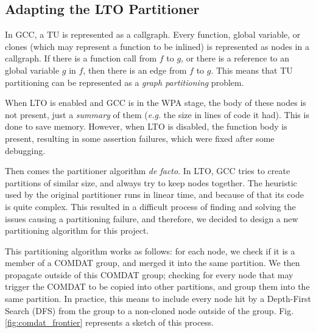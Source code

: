 \documentclass[runningheads]{llncs}
\begin{document}
\subsection{Adapting the LTO Partitioner}\label{sec:lto_partitioner}

In GCC, a TU is represented as a callgraph. Every function, global variable, or
clones (which may represent a function to be inlined) is represented as nodes
in a callgraph. If there is a function call from $f$ to $g$, or there is a
reference to an global variable $g$ in $f$, then there is an edge from $f$ to
$g$. This means that TU partitioning can be represented as a \emph{graph
partitioning} problem. 

When LTO is enabled and GCC is in the WPA stage, the body of these nodes
is not present, just a \textit{summary} of them (\textit{e.g.} the size
in lines of code it had). This is done to save memory. However,
when LTO is disabled, the function body is present, resulting
in some assertion failures, which were fixed after some debugging.

Then comes the partitioner algorithm \textit{de facto}. In LTO, GCC tries to
create partitions of similar size, and always try to keep nodes together. The
heuristic used by the original partitioner runs in linear time, and because of
that its code is quite complex. This resulted in a difficult process of finding
and solving the issues causing a partitioning failure, and therefore, we
decided to design a new partitioning algorithm for this project.

This partitioning algorithm works as follows: for each node, we check if it
is a member of a COMDAT \cite{comdat} group, and
merged it into the same partition. We then propagate outside of this COMDAT group;
checking for every node that may trigger the COMDAT to be copied into other
partitions, and group them into the same partition. In practice,
this means to include every node hit by a Depth-First
Search (DFS) from the group to a non-cloned node outside of the group.
Fig. \ref{fig:comdat_frontier} represents a sketch of this process.
\end{document}
